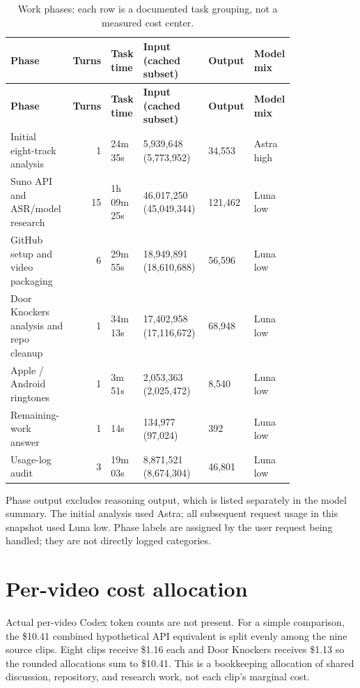 \documentclass[10pt]{article}
\newcommand{\smallnote}[1]{{\small\color{muted}#1}}
\begin{document}
\footnotesize\begin{longtable}{p{0.25\linewidth}r p{0.10\linewidth}p{0.28\linewidth}p{0.08\linewidth}p{0.10\linewidth}}
\caption{Work phases; each row is a documented task grouping, not a measured cost center.}\\
\toprule
\textbf{Phase} & \textbf{Turns} & \textbf{Task time} & \textbf{Input (cached subset)} & \textbf{Output} & \textbf{Model mix}\\
\midrule\endfirsthead
\toprule
\textbf{Phase} & \textbf{Turns} & \textbf{Task time} & \textbf{Input (cached subset)} & \textbf{Output} & \textbf{Model mix}\\
\midrule\endhead
Initial eight-track analysis & 1 & 24m 35s & 5,939,648 (5,773,952) & 34,553 & Astra high\\
Suno API and ASR/model research & 15 & 1h 09m 25s & 46,017,250 (45,049,344) & 121,462 & Luna low\\
GitHub setup and video packaging & 6 & 29m 55s & 18,949,891 (18,610,688) & 56,596 & Luna low\\
Door Knockers analysis and repo cleanup & 1 & 34m 13s & 17,402,958 (17,116,672) & 68,948 & Luna low\\
Apple / Android ringtones & 1 & 3m 51s & 2,053,363 (2,025,472) & 8,540 & Luna low\\
Remaining-work answer & 1 & 14s & 134,977 (97,024) & 392 & Luna low\\
Usage-log audit & 3 & 19m 03s & 8,871,521 (8,674,304) & 46,801 & Luna low\\
\bottomrule
\end{longtable}
\smallnote{Phase output excludes reasoning output, which is listed separately in the model summary. The initial analysis used Astra; all subsequent request usage in this snapshot used Luna low. Phase labels are assigned by the user request being handled; they are not directly logged categories.}

\section{Per-video cost allocation}
Actual per-video Codex token counts are not present. For a simple comparison, the \$10.41 combined hypothetical API equivalent is split evenly among the nine source clips. Eight clips receive \$1.16 each and Door Knockers receives \$1.13 so the rounded allocations sum to \$10.41. This is a bookkeeping allocation of shared discussion, repository, and research work, not each clip's marginal cost.
\end{document}
